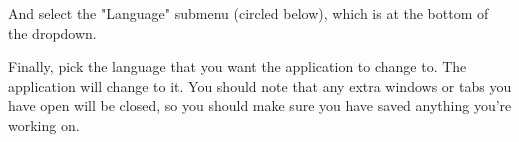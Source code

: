And select the "Language" submenu (circled below), which is at the bottom of the dropdown.

Finally, pick the language that you want the application to change to. The application will change to it. You should note that any extra windows or tabs you have open will be closed, so you should make sure you have saved anything you're working on.